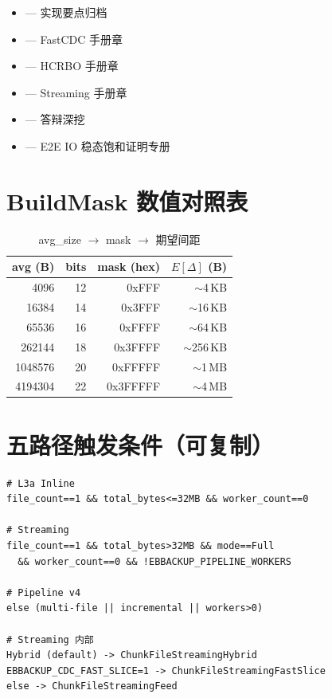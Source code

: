\begin{itemize}[nosep]
  \item {} — 实现要点归档
  \item {} — FastCDC 手册章
  \item {} — HCRBO 手册章
  \item {} — Streaming 手册章
  \item {} — 答辩深挖
  \item {} — E2E IO 稳态饱和证明专册
\end{itemize}

\section{BuildMask 数值对照表}

\begin{table}[htbp]
\centering
\caption{avg\_size $\rightarrow$ mask $\rightarrow$ 期望间距}
\small
\begin{tabular}{@{}rrrr@{}}
\toprule
avg (B) & bits & mask (hex) & $E[\Delta]$ (B) \\
\midrule
4096 & 12 & 0xFFF & $\sim$4\,KB \\
16384 & 14 & 0x3FFF & $\sim$16\,KB \\
65536 & 16 & 0xFFFF & $\sim$64\,KB \\
262144 & 18 & 0x3FFFF & $\sim$256\,KB \\
1048576 & 20 & 0xFFFFF & $\sim$1\,MB \\
4194304 & 22 & 0x3FFFFF & $\sim$4\,MB \\
\bottomrule
\end{tabular}
\end{table}

\section{五路径触发条件（可复制）}

\begin{verbatim}
# L3a Inline
file_count==1 && total_bytes<=32MB && worker_count==0

# Streaming
file_count==1 && total_bytes>32MB && mode==Full
  && worker_count==0 && !EBBACKUP_PIPELINE_WORKERS

# Pipeline v4
else (multi-file || incremental || workers>0)

# Streaming 内部
Hybrid (default) -> ChunkFileStreamingHybrid
EBBACKUP_CDC_FAST_SLICE=1 -> ChunkFileStreamingFastSlice
else -> ChunkFileStreamingFeed
\end{verbatim}
